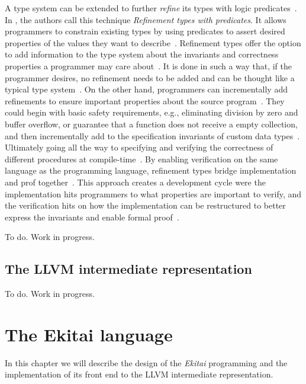 \documentclass[
  oneside,
  english,
  coorientadorbanca,
  noabntexcite
]{ufsc-thesis-rn46-2019}
\begin{document}
A type system can be extended to further \textit{refine} its types with logic predicates~\cite{jhala2020tutorial}.
In \textcite{jhala2020tutorial}, the authors call this technique \textit{Refinement types with predicates}.
It allows programmers to constrain existing types by using predicates to assert desired properties of the values they want to describe~\cite{jhala2020tutorial}.
Refinement types offer the option to add information to the type system about the invariants and correctness properties a programmer may care about~\cite{jhala2020tutorial}.
It is done in such a way that, if the programmer desires, no refinement needs to be added and can be thought like a typical type system~\cite{jhala2020tutorial}.
On the other hand, programmers can incrementally add refinements to ensure important properties about the source program~\cite{jhala2020tutorial}.
They could begin with basic safety requirements, e.g., eliminating division by zero and buffer overflow, or guarantee that a function does not receive a empty collection, and then incrementally add to the specification invariants of custom data types~\cite{jhala2020tutorial}.
Ultimately going all the way to specifying and verifying the correctness of different procedures at compile-time~\cite{jhala2020tutorial}.
By enabling verification on the same language as the programming language, refinement types bridge implementation and prof together~\cite{jhala2020tutorial}.
This approach creates a development cycle were the implementation hits programmers to what properties are important to verify, and the verification hits on how the implementation can be restructured to better express the invariants and enable formal proof~\cite{jhala2020tutorial}.

To do. Work in progress.

\section{The LLVM intermediate representation}

To do. Work in progress.

\chapter{The Ekitai language}\label{chapter:proposal}

In this chapter we will describe the design of the \textit{Ekitai} programming and the implementation of its front end to the LLVM intermediate representation.
\end{document}
